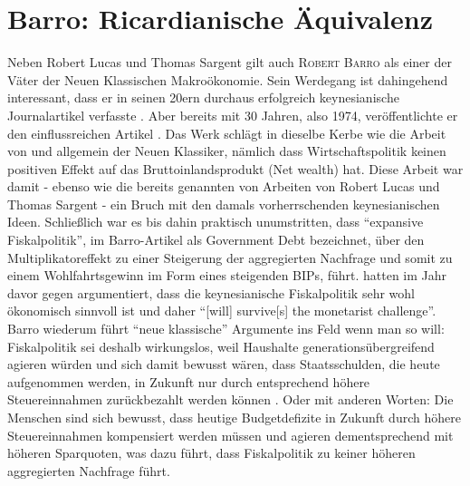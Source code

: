 \section{Barro: Ricardianische Äquivalenz}
Neben Robert Lucas und Thomas Sargent gilt auch \textsc{Robert Barro} als einer der Väter der Neuen Klassischen Makroökonomie. Sein Werdegang ist dahingehend interessant, dass er in seinen 20ern durchaus erfolgreich keynesianische Journalartikel verfasste \parencite{Barro1971}. Aber bereits mit 30 Jahren, also 1974, veröffentlichte er den einflussreichen Artikel  \parencite{Barro1974}. Das Werk schlägt in dieselbe Kerbe wie die Arbeit von \textcite{Sargent1975} und allgemein der Neuen Klassiker, nämlich dass Wirtschaftspolitik keinen positiven Effekt auf das Bruttoinlandsprodukt (Net wealth) hat. Diese Arbeit war damit - ebenso wie die bereits genannten von Arbeiten von Robert Lucas und Thomas Sargent - ein Bruch mit den damals vorherrschenden keynesianischen Ideen. Schließlich war es bis dahin praktisch unumstritten, dass "`expansive Fiskalpolitik"', im Barro-Artikel als Government Debt bezeichnet, über den Multiplikatoreffekt zu einer Steigerung der aggregierten Nachfrage und somit zu einem Wohlfahrtsgewinn im Form eines steigenden BIPs, führt. \textcite[S. 336]{Blinder1973} hatten im Jahr davor gegen argumentiert, dass die keynesianische Fiskalpolitik sehr wohl ökonomisch sinnvoll ist und daher "`[will] survive[s] the monetarist challenge"'. Barro wiederum führt "`neue klassische"' Argumente ins Feld wenn man so will: Fiskalpolitik sei deshalb wirkungslos, weil Haushalte generationsübergreifend agieren würden und sich damit bewusst wären, dass Staatsschulden, die heute aufgenommen werden, in Zukunft nur durch entsprechend höhere Steuereinnahmen zurückbezahlt werden können \textcite[S. 1116]{Barro1974}. Oder mit anderen Worten: Die Menschen sind sich bewusst, dass heutige Budgetdefizite in Zukunft durch höhere Steuereinnahmen kompensiert werden müssen und agieren dementsprechend mit höheren Sparquoten, was dazu führt, dass Fiskalpolitik zu keiner höheren aggregierten Nachfrage führt. 
